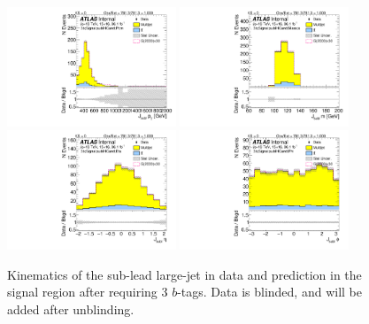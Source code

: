 \begin{figure}[htbp!]
\begin{center}
\includegraphics[width=0.45\textwidth,angle=-90]{figures/boosted/Signal/b77_ThreeTag_Signal_sublHCand_Pt_m_blind.pdf}
\includegraphics[width=0.45\textwidth,angle=-90]{figures/boosted/Signal/b77_ThreeTag_Signal_sublHCand_Mass_s_blind.pdf}\\
\includegraphics[width=0.45\textwidth,angle=-90]{figures/boosted/Signal/b77_ThreeTag_Signal_sublHCand_Eta_blind.pdf}
\includegraphics[width=0.45\textwidth,angle=-90]{figures/boosted/Signal/b77_ThreeTag_Signal_sublHCand_Phi_blind.pdf}
  \caption{Kinematics of the sub-lead large-\R jet in data and prediction in the signal region after requiring 3 $b$-tags. Data is blinded, and will be added after unblinding.}
  \label{fig:boosted-3b-signal-blind-ak10-subl}
\end{center}
\end{figure}

